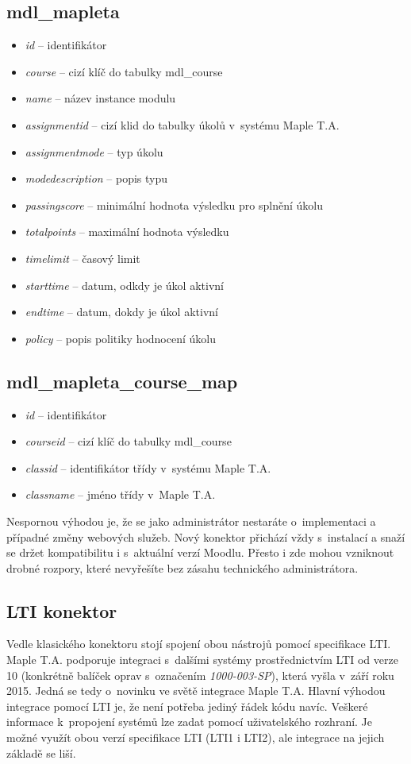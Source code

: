 \documentclass[
print,
  11pt,
  table,   
  nolof,    
  nolot,
  oneside,final
]{fithesis3}
\begin{document}
\subsection*{mdl\_mapleta}
\begin{itemize}
	\item \textit{id} -- identifikátor
	\item \textit{course} -- cizí klíč do tabulky mdl\_course
	\item \textit{name} -- název instance modulu
	\item \textit{assignmentid} -- cizí klid do tabulky úkolů v~systému Maple T.A.
	\item \textit{assignmentmode} -- typ úkolu
	\item \textit{modedescription} -- popis typu
	\item \textit{passingscore} -- minimální hodnota výsledku pro splnění úkolu
	\item \textit{totalpoints} -- maximální hodnota výsledku
	\item \textit{timelimit} -- časový limit
	\item \textit{starttime} -- datum, odkdy je úkol aktivní
	\item \textit{endtime} -- datum, dokdy je úkol aktivní
	\item \textit{policy} -- popis politiky hodnocení úkolu 
\end{itemize}
\subsection*{mdl\_mapleta\_course\_map}
\begin{itemize}
	\item \textit{id} -- identifikátor
	\item \textit{courseid} --  cizí klíč do tabulky mdl\_course
	\item \textit{classid} -- identifikátor třídy v~systému Maple T.A.
	\item \textit{classname} -- jméno třídy v~Maple T.A.

\end{itemize}

Nespornou výhodou je, že se jako administrátor nestaráte o~implementaci a případné změny webových služeb. Nový konektor přichází vždy s~instalací a snaží se držet kompatibilitu i s~aktuální verzí Moodlu. Přesto i zde mohou vzniknout drobné rozpory, které nevyřešíte bez zásahu technického administrátora.

		\subsection{LTI konektor}
Vedle klasického konektoru stojí spojení obou nástrojů pomocí specifikace LTI. Maple T.A. podporuje integraci s~dalšími systémy prostřednictvím LTI od verze 10 (konkrétně balíček oprav s~označením \emph{1000-003-SP}), která vyšla v~září roku 2015. Jedná se tedy o~novinku ve světě integrace Maple T.A. Hlavní výhodou integrace pomocí LTI je, že není potřeba jediný řádek kódu navíc. Veškeré informace k~propojení systémů lze zadat pomocí uživatelského rozhraní. Je možné využít obou verzí specifikace LTI (LTI1 i LTI2), ale integrace na jejich základě se liší.
\end{document}
